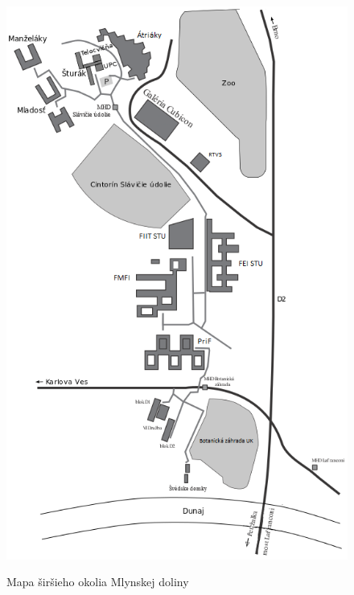 \begin{figure}[h!]
	\begin{centering}
		\includegraphics[width=1.8\textwidth,height=1.059\textheight,keepaspectratio]{obrazky/mapka_okolie_PriF}\label{fig:mapka_okolia_PriF}
		\par\end{centering}
	\protect\caption{Mapa širšieho okolia Mlynskej doliny}
\end{figure}




